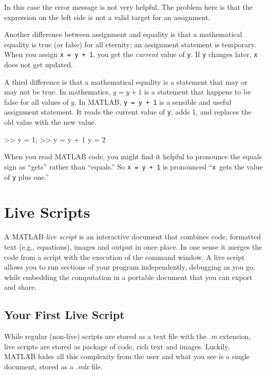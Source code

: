 \documentclass[../../book.tex]{subfiles}
\begin{document}
In this case the error message is not very helpful.  The problem here is that the expression on the left side is not a valid target for an assignment.


Another difference between assignment and equality is that a mathematical equality is true (or false) for all eternity;
an assignment statement is temporary.
When you assign \lstinline{x = y + 1}, you get the
\emph{current} value of \lstinline{y}.  If \lstinline{y} changes later, \lstinline{x}
does not get updated.

A third difference is that a mathematical equality is a statement that
may or may not be true.  In mathematics, $y = y+1$ is a statement that
happens to be false for all values of $y$.
In MATLAB, \lstinline{y = y + 1} is a sensible and useful assignment statement.
It reads the current value of \lstinline{y}, adds 1, and replaces the old value with the new value.

\begin{code}
>> y = 1;
>> y = y + 1
y = 2
\end{code}

When you read MATLAB code, you might find it helpful to pronounce
the equals sign as ``gets'' rather than ``equals.''  So \lstinline{x = y + 1}
is pronounced ``\lstinline{x}~gets the value of \lstinline{y} plus one.''

\section{Live Scripts}

A MATLAB \emph{live script} is an interactive document that combines code, formatted text (e.g., equations), images and output in once place.  In one sense it merges the code from a script with the execution of the command window.  A live script allows you to run sections of your program independently, debugging as you go, while embedding the computation in a portable document that you can export and share.

\subsection{Your First Live Script}

While regular (non-live) scripts are stored as a text file with the \emph{.m} extension, live scripts are stored as package of code, rich text and images.   Luckily, MATLAB hides all this complexity from the user and what you see is a single document, stored as a \emph{.mlx} file.
\end{document}

